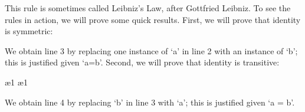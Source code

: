 This rule is sometimes called Leibniz’s Law, after Gottfried Leibniz. To see the rules in action, we will prove some quick results. First, we will prove that identity is symmetric:
\begin{fitchproof}
\open
{}
\ii{}	
\close
{}	
\end{fitchproof}
We obtain line 3 by replacing one instance of ‘a’ in line 2 with an instance of ‘b’; this is justified given ‘a=b’. Second, we will prove that identity is transitive:
\begin{fitchproof}
\open
{}			
\ae{1}
\ae{1}
\close
{}
\end{fitchproof}
We obtain line 4 by replacing ‘b’ in line 3 with ‘a’; this is justified given ‘a = b’.

